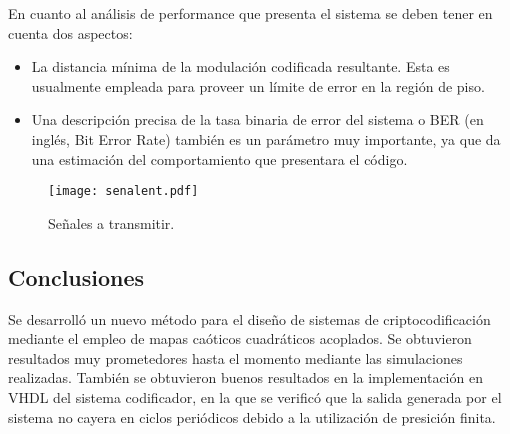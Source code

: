 En cuanto al análisis de performance que presenta el sistema se
deben tener en cuenta dos aspectos:

\begin{itemize}
    \item
        La distancia mínima de la modulación codificada resultante. Esta  es
        usualmente empleada para proveer un límite de error en la región
        de piso.
    \item
        Una descripción precisa de la tasa binaria de error
        del sistema o BER (en inglés, Bit Error Rate) también es un
        parámetro muy importante, ya que da una estimación del
        comportamiento que presentara el código.
\end{itemize}


\begin{figure}
    \centering
    \texttt{[image: senalent.pdf]}\\
    \caption{Señales a transmitir.}\label{senal}
\end{figure}

\subsection{Conclusiones}

Se desarrolló un nuevo método para el diseño de sistemas de
criptocodificación mediante el empleo de mapas caóticos
cuadráticos acoplados. Se obtuvieron resultados muy prometedores
hasta el momento mediante las simulaciones realizadas. También se
obtuvieron buenos resultados en la implementación en VHDL del
sistema codificador, en la que se verificó que la salida generada
por el sistema no cayera en ciclos periódicos debido a la
utilización de presición finita.